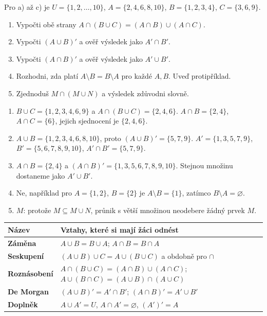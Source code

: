 \documentclass[11pt,a4paper]{article}
\begin{document}
\begin{zadaniReseniBox}[title={Domácí úkol}]
Pro a) až c) je $U=\{1,2,\ldots,10\}$,
$A=\{2,4,6,8,10\}$, $B=\{1,2,3,4\}$, $C=\{3,6,9\}$.
\begin{enumerate}[label=\alph*)]
\item Vypočti obě strany $A\cap(B\cup C)=(A\cap B)\cup(A\cap C)$.
\item Vypočti $(A\cup B)'$ a ověř výsledek jako $A'\cap B'$.
\item Vypočti $(A\cap B)'$ a ověř výsledek jako $A'\cup B'$.
\item Rozhodni, zda platí $A\setminus B=B\setminus A$ pro každé $A,B$.
Uveď protipříklad.
\item Zjednoduš $M\cap(M\cup N)$ a výsledek zdůvodni slovně.
\end{enumerate}
\tcblower
\begin{enumerate}[label=\alph*)]
\item $B\cup C=\{1,2,3,4,6,9\}$ a
$A\cap(B\cup C)=\{2,4,6\}$.
$A\cap B=\{2,4\}$, $A\cap C=\{6\}$,
jejich sjednocení je $\{2,4,6\}$.
\item $A\cup B=\{1,2,3,4,6,8,10\}$, proto
$(A\cup B)'=\{5,7,9\}$.
$A'=\{1,3,5,7,9\}$, $B'=\{5,6,7,8,9,10\}$,
$A'\cap B'=\{5,7,9\}$.
\item $A\cap B=\{2,4\}$ a
$(A\cap B)'=\{1,3,5,6,7,8,9,10\}$.
Stejnou množinu dostaneme jako $A'\cup B'$.
\item Ne, například pro $A=\{1,2\}$, $B=\{2\}$ je
$A\setminus B=\{1\}$, zatímco $B\setminus A=\varnothing$.
\item $M$: protože $M\subseteq M\cup N$, průnik s větší množinou
neodebere žádný prvek $M$.
\end{enumerate}
\end{zadaniReseniBox}

\small
\begin{tabularx}{\linewidth}{@{}>{\bfseries}p{25mm}X@{}}
\toprule
Název & Vztahy, které si mají žáci odnést \\ \midrule
Záměna & $A\cup B=B\cup A$; $A\cap B=B\cap A$ \\
Seskupení & $(A\cup B)\cup C=A\cup(B\cup C)$ a obdobně pro $\cap$ \\
Roznásobení & $A\cap(B\cup C)=(A\cap B)\cup(A\cap C)$;\newline
$A\cup(B\cap C)=(A\cup B)\cap(A\cup C)$ \\
De Morgan & $(A\cup B)'=A'\cap B'$; $(A\cap B)'=A'\cup B'$ \\
Doplněk & $A\cup A'=U$, $A\cap A'=\varnothing$, $(A')'=A$ \\
\bottomrule
\end{tabularx}
\normalsize
\end{document}
